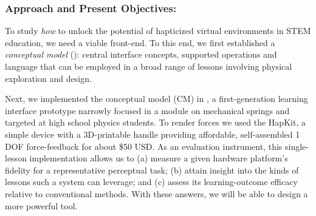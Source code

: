 %

\subsubsection{Approach and Present Objectives:}
To study \textit{how} to unlock the potential of hapticized virtual environments in STEM education, we need a viable front-end.
%
%
To this end, we first established a \textit{conceptual model} (\HandsOn):
central interface concepts, supported operations and language  \cite{johnson_conceptual_2002} that can be employed in a broad range of lessons involving physical exploration and design. 

Next, we implemented the \HandsOn conceptual model (CM) in \SpringSim, a first-generation learning interface prototype narrowly focused in a module on mechanical springs and targeted at high school physics students.
To render forces we used the HapKit, a simple device with a 3D-printable handle providing affordable, self-assembled 1 DOF force-feedback for about \$50 USD.
%
As an evaluation instrument, this single-lesson implementation allows us to 
(a) measure a given hardware platform's fidelity for a representative perceptual task; 
(b) attain insight into the kinds of lessons such a system can  leverage; and
(c) assess its learning-outcome efficacy relative to conventional methods.
With these answers, we will be able to design a more powerful tool.


